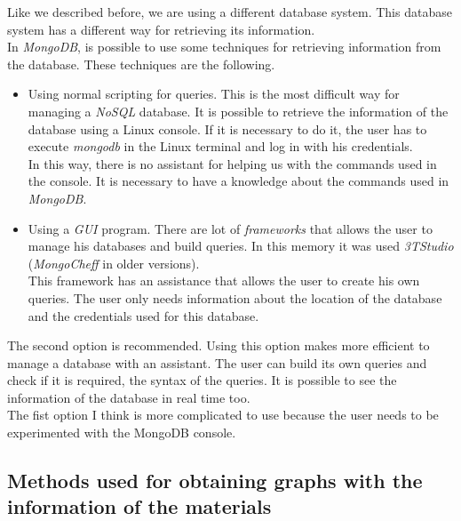 Like we described before, we are using a different database system. This database system has a different way for retrieving its information.\\

In \textit{MongoDB}, is possible to use some techniques for retrieving information from the database. These techniques are the following.

\begin{itemize}

\item Using normal scripting for queries. This is the most difficult way for managing a \textit{NoSQL} database. It is possible to retrieve the information of the database using a Linux console. If it is necessary to do it, the user has to execute \textit{mongodb} in the Linux terminal and log in with his credentials.\\

In this way, there is no assistant for helping us with the commands used in the console. It is necessary to have a knowledge about the commands used in \textit{MongoDB}.

\item Using a \textit{GUI} program. There are lot of \textit{frameworks} that allows the user to manage his databases and build queries. In this memory it was used \textit{3TStudio} (\textit{MongoCheff} in older versions).\\

This framework has an assistance that allows the user to create his own queries. The user only needs information about the location of the database and the credentials used for this database.

\end{itemize}

The second option is recommended. Using this option makes more efficient to manage a database with an assistant. The user can build its own queries and check if it is required, the syntax of the queries. It is possible to see the information of the database in real time too.\\

The fist option I think is more complicated to use because the user needs to be experimented with the MongoDB console.

\subsection{Methods used for obtaining graphs with the information of the materials}

